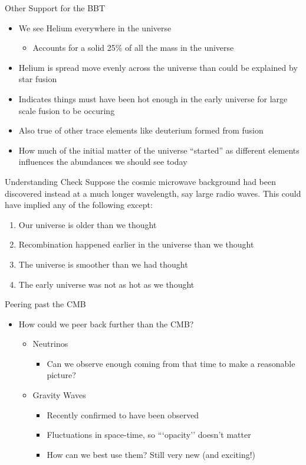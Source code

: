 \documentclass[pdf,aspectratio=169]{beamer}
\begin{document}
\begin{frame}{Other Support for the BBT}
  \begin{itemize}
	\item We see Helium everywhere in the universe
	  \begin{itemize}
		\item Accounts for a solid 25\% of all the mass in the universe
	  \end{itemize}
	\item Helium is spread move evenly across the universe than could be explained by star fusion
	\item Indicates things must have been hot enough in the early universe for large scale fusion to be occuring
	\item Also true of other trace elements like deuterium formed from fusion
	\item How much of the initial matter of the universe ``started'' as different elements influences the abundances we should see today
  \end{itemize}
\end{frame}

\begin{frame}{Understanding Check}
  Suppose the cosmic microwave background had been discovered instead at a much longer wavelength, say large radio waves. This could have implied any of the following \alert{except}:
  \begin{enumerate}
	\item Our universe is older than we thought
	\item Recombination happened earlier in the universe than we thought
	\item \alert<2>{The universe is smoother than we had thought}
	\item The early universe was not as hot as we thought
  \end{enumerate}
\end{frame}


\begin{frame}{Peering past the CMB}
  \begin{itemize}
	\item How could we peer back further than the CMB?
	  \begin{itemize}
		\item Neutrinos
		  \begin{itemize}
			\item Can we observe enough coming from that time to make a reasonable picture?
		  \end{itemize}
		\item Gravity Waves
		  \begin{itemize}
			\item Recently confirmed to have been observed
			\item Fluctuations in space-time, so ```opacity'' doesn't matter
			\item How can we best use them? Still very new (and exciting!)
		  \end{itemize}
	  \end{itemize}
  \end{itemize}
\end{frame}
\end{document}
